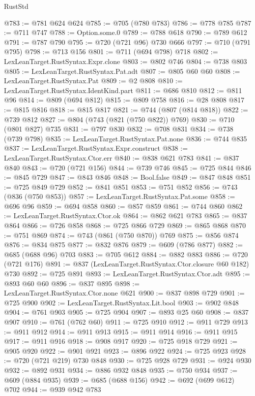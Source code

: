 \begin{lexlean}{RustStd}
\begin{coremodule}
@783 := @781 @624 @624
@785 := @705 (@780 @783)
@786 := @778 @785
@787 := @711 @747
@788 := Option.some.{0}
@789 := @788 @618
@790 := @789 @612
@791 := @787 @790
@795 := @720 (@721 @96) @730 @666
@797 := @710 (@791 @795)
@798 := @713 @156
@801 := @711 (@694 @798) @718
@802 := LexLeanTarget.RustSyntax.Expr.clone
@803 := @802 @746
@804 := @738 @803
@805 := LexLeanTarget.RustSyntax.Pat.adt
@807 := @805 @60 @60
@808 := LexLeanTarget.RustSyntax.Pat
@809 := @2 @808
@810 := LexLeanTarget.RustSyntax.IdentKind.part
@811 := @686 @810
@812 := @811 @96
@814 := @809 (@694 @812)
@815 := @809 @758
@816 := @28 @808
@817 := @815 @816
@818 := @815 @817
@821 := @744 (@807 (@814 @818))
@822 := @739 @812
@827 := @804 (@743 (@821 (@750 @822)) @769)
@830 := @710 (@801 @827) @735
@831 := @797 @830
@832 := @708 @831
@834 := @738 (@739 @798)
@835 := LexLeanTarget.RustSyntax.Pat.none
@836 := @744 @835
@837 := LexLeanTarget.RustSyntax.Expr.construct
@838 := LexLeanTarget.RustSyntax.Ctor.err
@840 := @838 @621 @783
@841 := @837 @840
@843 := @720 (@721 @156)
@844 := @739 @746
@845 := @725 @844
@846 := @845 @729
@847 := @843 @846
@848 := Bool.false
@849 := @847 @848
@851 := @725 @849 @729
@852 := @841 @851
@853 := @751 @852
@856 := @743 (@836 (@750 @853))
@857 := LexLeanTarget.RustSyntax.Pat.some
@858 := @696 @96
@859 := @694 @858
@860 := @857 @859
@861 := @744 @860
@862 := LexLeanTarget.RustSyntax.Ctor.ok
@864 := @862 @621 @783
@865 := @837 @864
@866 := @726 @858
@868 := @725 @866 @729
@869 := @865 @868
@870 := @751 @869
@874 := @743 (@861 (@750 @870)) @769
@875 := @856 @874
@876 := @834 @875
@877 := @832 @876
@879 := @609 (@786 @877)
@882 := @685 (@688 @96) @703
@883 := @705 @612
@884 := @882 @883
@886 := @720 (@721 @176)
@891 := @837 (LexLeanTarget.RustSyntax.Ctor.closure @60 @182) @730
@892 := @725 @891
@893 := LexLeanTarget.RustSyntax.Ctor.adt
@895 := @893 @60 @60
@896 := @837 @895
@898 := LexLeanTarget.RustSyntax.Ctor.none @621
@900 := @837 @898 @729
@901 := @725 @900
@902 := LexLeanTarget.RustSyntax.Lit.bool
@903 := @902 @848
@904 := @761 @903
@905 := @725 @904
@907 := @893 @25 @60
@908 := @837 @907
@910 := @761 (@762 @60)
@911 := @725 @910
@912 := @911 @729
@913 := @911 @912
@914 := @911 @913
@915 := @911 @914
@916 := @911 @915
@917 := @911 @916
@918 := @908 @917
@920 := @725 @918 @729
@921 := @905 @920
@922 := @901 @921
@923 := @896 @922
@924 := @725 @923
@928 := @720 (@721 @219) @730 @848
@930 := @725 @928 @729
@931 := @924 @930
@932 := @892 @931
@934 := @886 @932 @848
@935 := @750 @934
@937 := @609 (@884 @935)
@939 := @685 (@688 @156)
@942 := @692 (@699 @612) @702
@944 := @939 @942 @783

\end{coremodule}
\end{lexlean}
